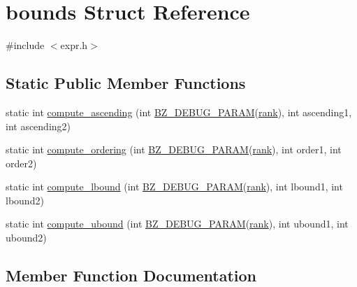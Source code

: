 \hypertarget{structbounds}{}\section{bounds Struct Reference}
\label{structbounds}


{\ttfamily \#include $<$expr.\+h$>$}

\subsection*{Static Public Member Functions}
\begin{DoxyCompactItemize}
\item 
static int \hyperlink{structbounds_a957ee2335ff03bce890aa82e14db6fb3}{compute\+\_\+ascending} (int \hyperlink{bzdebug_8h_a8da20913b848afd5500d54e384544e20}{B\+Z\+\_\+\+D\+E\+B\+U\+G\+\_\+\+P\+A\+R\+A\+M}(\hyperlink{zfftnd_8c_a6cfd95afd0afebd625b889fb6e58371c}{rank}), int ascending1, int ascending2)
\item 
static int \hyperlink{structbounds_aa3352982c159a5ebdcea6bf8a37f6a68}{compute\+\_\+ordering} (int \hyperlink{bzdebug_8h_a8da20913b848afd5500d54e384544e20}{B\+Z\+\_\+\+D\+E\+B\+U\+G\+\_\+\+P\+A\+R\+A\+M}(\hyperlink{zfftnd_8c_a6cfd95afd0afebd625b889fb6e58371c}{rank}), int order1, int order2)
\item 
static int \hyperlink{structbounds_a9c90cce09e8f54aab764d6807193b452}{compute\+\_\+lbound} (int \hyperlink{bzdebug_8h_a8da20913b848afd5500d54e384544e20}{B\+Z\+\_\+\+D\+E\+B\+U\+G\+\_\+\+P\+A\+R\+A\+M}(\hyperlink{zfftnd_8c_a6cfd95afd0afebd625b889fb6e58371c}{rank}), int lbound1, int lbound2)
\item 
static int \hyperlink{structbounds_a320a093af3b97638a98f25873b2047ff}{compute\+\_\+ubound} (int \hyperlink{bzdebug_8h_a8da20913b848afd5500d54e384544e20}{B\+Z\+\_\+\+D\+E\+B\+U\+G\+\_\+\+P\+A\+R\+A\+M}(\hyperlink{zfftnd_8c_a6cfd95afd0afebd625b889fb6e58371c}{rank}), int ubound1, int ubound2)
\end{DoxyCompactItemize}


\subsection{Member Function Documentation}
\hypertarget{structbounds_a957ee2335ff03bce890aa82e14db6fb3}{}
